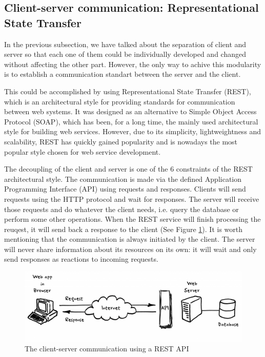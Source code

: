 \subsection{Client-server communication: Representational State Transfer}
\label{subsection:rest}

In the previous subsection, we have talked about the separation of client and server so that each one of them could be individually developed and changed without affecting the other part. However, the only way to achive this modularity is to establish a communication standart between the server and the client.

This could be accomplished by using Representational State Transfer (REST), which is an architectural style for providing standards for communication between web systems. It was designed as an alternative to Simple Object Access Protocol (SOAP), which has been, for a long time, the mainly used architectural style for building web services. However, due to its simplicity, lightweightness and scalability, REST has quickly gained popularity and is nowadays the most popular style chosen for web service development.

The decoupling of the client and server is one of the 6 constraints of the REST architectural style. The communication is made via the defined Application Programming Interface (API) using requests and responses. Clients will send requests using the HTTP protocol and wait for responses. The server will receive those requests and do whatever the client needs, i.e. query the database or perform some other operations. When the REST service will finish processing the reuqest, it will send back a response to the client (See Figure \ref{rest}). It is worth mentioning that the communication is always initiated by the client. The server will never share information about its resources on its own: it will wait and only send responses as reactions to incoming requests.

\begin{figure}[H]
    \centering
    \includegraphics[width=5in]{images/rest}
    \caption{The client-server communication using a REST API \cite{rest}}
    \label{rest}
\end{figure}

